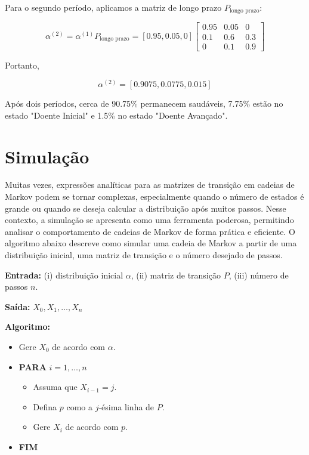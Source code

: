 \documentclass[12pt, a4paper, openany]{book}
\numberwithin{equation}{chapter}
\numberwithin{table}{chapter}
\numberwithin{figure}{chapter}
\theoremstyle{break}
\begin{document}
Para o segundo período, aplicamos a matriz de longo prazo \( P_{\text{longo prazo}} \):

\[
\alpha^{(2)} = \alpha^{(1)} P_{\text{longo prazo}} = [0.95, 0.05, 0] \begin{bmatrix} 0.95 & 0.05 & 0 \\ 0.1 & 0.6 & 0.3 \\ 0 & 0.1 & 0.9 \end{bmatrix}
\]


Portanto,

\[
\alpha^{(2)} = [0.9075, 0.0775, 0.015]
\]

Após dois períodos, cerca de 90.75\% permanecem saudáveis, 7.75\% estão no estado "Doente Inicial" e 1.5\% no estado "Doente Avançado".



\section{Simulação}

Muitas vezes, expressões analíticas para as matrizes de transição em cadeias de Markov podem se tornar complexas, especialmente quando o número de estados é grande ou quando se deseja calcular a distribuição após muitos passos. Nesse contexto, a simulação se apresenta como uma ferramenta poderosa, permitindo analisar o comportamento de cadeias de Markov de forma prática e eficiente. O algoritmo abaixo descreve como simular uma cadeia de Markov a partir de uma distribuição inicial, uma matriz de transição e o número desejado de passos.

\textbf{Entrada:} (i) distribuição inicial \( \alpha \), (ii) matriz de transição \( P \), (iii) número de passos \( n \).

\textbf{Saída:} \( X_0, X_1, \dots, X_n \)

\textbf{Algoritmo:}
\begin{itemize}
    \item Gere \( X_0 \) de acordo com \( \alpha \).
    \item \textbf{PARA} \( i = 1, \dots, n \)
    \begin{itemize}
        \item Assuma que \( X_{i-1} = j \).
        \item Defina \( p \) como a \( j \)-ésima linha de \( P \).
        \item Gere \( X_i \) de acordo com \( p \).
    \end{itemize}
    \item \textbf{FIM}
\end{itemize}
\end{document}
